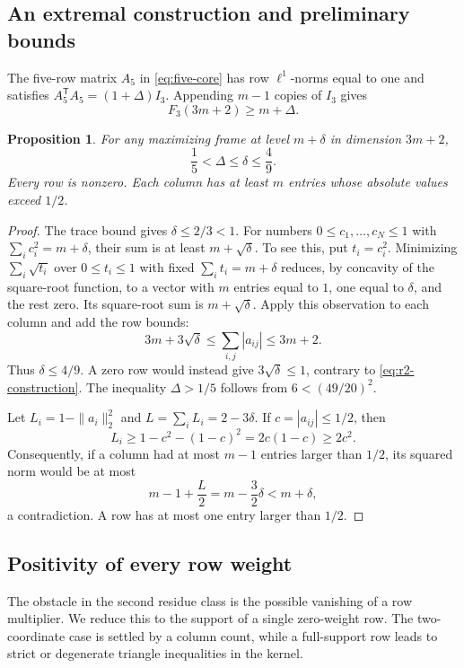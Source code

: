 \documentclass[11pt]{article}
\numberwithin{equation}{section}
\newtheorem{proposition}[proposition]{Proposition}
\theoremstyle{definition}
\theoremstyle{definition}
\newcommand{\F}{F_3}
\begin{document}
\subsection{An extremal construction and preliminary bounds}

The five-row matrix $A_5$ in \eqref{eq:five-core} has row
$\ell^1$-norms equal to one and satisfies
$A_5^{\mathsf T}A_5=(1+\Delta)I_3$.
Appending $m-1$ copies of $I_3$ gives
\begin{equation}
 \F(3m+2)\ge m+\Delta.
 \label{eq:r2-construction}
\end{equation}

\begin{proposition}\label{prop:r2-column-bounds}
For any maximizing frame at level $m+\delta$ in dimension $3m+2$,
\[
 \frac15<\Delta\le\delta\le\frac49.
\]
Every row is nonzero.  Each column has at least $m$ entries whose
absolute values exceed $1/2$.
\end{proposition}

\begin{proof}
The trace bound gives $\delta\le2/3<1$.  For numbers
$0\le c_1,\ldots,c_N\le1$ with
$\sum_i c_i^2=m+\delta$, their sum is at least
$m+\sqrt\delta$.  To see this, put $t_i=c_i^2$.  Minimizing
$\sum_i\sqrt{t_i}$ over $0\le t_i\le1$ with fixed
$\sum_i t_i=m+\delta$ reduces, by concavity of the square-root
function, to a vector with $m$ entries equal to $1$, one equal to
$\delta$, and the rest zero.  Its square-root sum is
$m+\sqrt\delta$.
Apply this observation to each column and add the row bounds:
\[
 3m+3\sqrt\delta\le\sum_{i,j}|a_{ij}|\le3m+2.
\]
Thus $\delta\le4/9$. A zero row would instead give
$3\sqrt\delta\le1$, contrary to \eqref{eq:r2-construction}.
The inequality $\Delta>1/5$ follows from $6<(49/20)^2$.

Let $L_i=1-\|a_i\|_2^2$ and $L=\sum_iL_i=2-3\delta$.
If $c=|a_{ij}|\le1/2$, then
\[
 L_i\ge1-c^2-(1-c)^2=2c(1-c)\ge2c^2.
\]
Consequently, if a column had at most $m-1$ entries larger than
$1/2$, its squared norm would be at most
\[
 m-1+\frac L2=m-\frac32\delta<m+\delta,
\]
a contradiction. A row has at most one entry larger than $1/2$.
\end{proof}

\subsection{Positivity of every row weight}

The obstacle in the second residue class is the possible vanishing
of a row multiplier. We reduce this to the support of a single
zero-weight row. The two-coordinate case is settled by a column
count, while a full-support row leads to strict or degenerate
triangle inequalities in the kernel.
\end{document}

